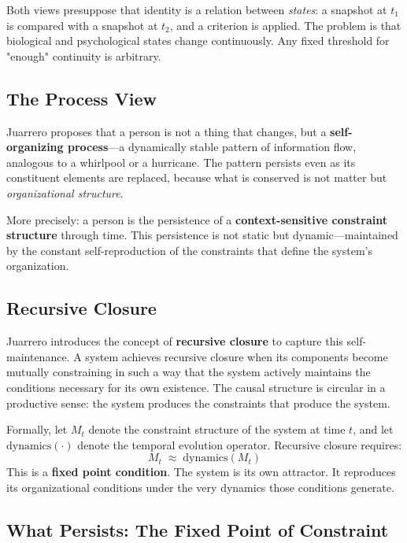 \documentclass[11pt]{article}
\begin{document}
Both views presuppose that identity is a relation between \emph{states}: a snapshot at
$t_1$ is compared with a snapshot at $t_2$, and a criterion is applied. The problem is
that biological and psychological states change continuously. Any fixed threshold for
"enough" continuity is arbitrary.

\subsection{The Process View}

Juarrero proposes that a person is not a thing that changes, but a \textbf{self-organizing
process}—a dynamically stable pattern of information flow, analogous to a whirlpool or a
hurricane. The pattern persists even as its constituent elements are replaced, because
what is conserved is not matter but \emph{organizational structure}.

More precisely: a person is the persistence of a \textbf{context-sensitive constraint
structure} through time. This persistence is not static but dynamic—maintained by the
constant self-reproduction of the constraints that define the system's organization.

\subsection{Recursive Closure}

Juarrero introduces the concept of \textbf{recursive closure} to capture this
self-maintenance. A system achieves recursive closure when its components become mutually
constraining in such a way that the system actively maintains the conditions necessary for
its own existence. The causal structure is circular in a productive sense: the system
produces the constraints that produce the system.

Formally, let $M_t$ denote the constraint structure of the system at time $t$, and let
$\mathrm{dynamics}(\cdot)$ denote the temporal evolution operator. Recursive closure
requires:
\[
M_t \;\approx\; \mathrm{dynamics}(M_t)
\]
This is a \textbf{fixed point condition}. The system is its own attractor. It reproduces
its organizational conditions under the very dynamics those conditions generate.

\subsection{What Persists: The Fixed Point of Constraint}
\end{document}
